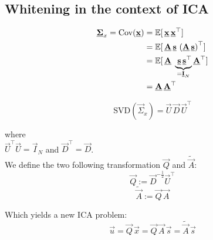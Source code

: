 \subsection{Whitening in the context of ICA}

\begin{frame}

\begin{align}
\label{eq:expxina}
\underline{\mathbf{\Sigma}}_x = \mathrm{Cov}(\underline{\mathbf{x}}) &=  \mathbb{E} \lbrack \, \underline{\mathbf{x}} \, \underline{\mathbf{x}}^\top \rbrack\\
&=  \mathbb{E} \lbrack \, \underline{\mathbf{A}}\,\underline{\mathbf{s}} \, \left( \underline{\mathbf{A}}\,\underline{\mathbf{s}} \right)^\top \rbrack\\
&=  \mathbb{E} \lbrack \, \underline{\mathbf{A}}\; \underbrace{\;\underline{\mathbf{s}} \, \underline{\mathbf{s}}^\top}_{= \underline{\mathbf{I}}_N} \underline{\mathbf{A}}^\top \rbrack\\
\label{eq:sigmax}
&=  \underline{\mathbf{A}}\, \underline{\mathbf{A}}^\top
\end{align}

\end{frame}

\begin{frame}


\begin{equation}
\mathrm{SVD}(\vec \Sigma_x) = \vec U\, \vec D \, \vec U^\top
\end{equation}

where\\
 $\vec U^\top\vec U = \vec I_N$ and
$\vec D^\top = \vec D$.\\

We define the two following transformation $\vec Q$ and $\widetilde{\vec A}$:
\begin{equation}
\label{eq:defq}
\vec Q := \vec D^{-\frac{1}{2}} \vec U^\top
\end{equation}
\begin{equation}
\label{eq:defatilde}
\widetilde{\vec A} := \vec Q \, \vec A 
\end{equation}

Which yields a new ICA problem:
\begin{equation}
\vec u = \vec Q\, \vec x = \vec Q\,\vec A \, \vec s = \widetilde{\vec A} \, \vec s
\end{equation}

 \\

\end{frame}

